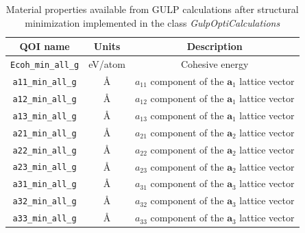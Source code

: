 \begin{table}[ht]
	\centering
	\caption{Material properties available from GULP calculations after structural minimization implemented in the class \emph{GulpOptiCalculations}}
	\label{tbl:pypospack_qoi_gulp_opti}
	\begin{tabular}{ccc}
		\hline
		QOI name & Units & Description \\
		\hline
		\verb|Ecoh_min_all_g|
		    & eV/atom
				& Cohesive energy\\
    \verb|a11_min_all_g|
		    & \AA
				& $a_{11}$ component of the $\bm{a}_1$ lattice vector \\
	  \verb|a12_min_all_g|
		    & \AA
				& $a_{12}$ component of the $\bm{a}_1$ lattice vector \\
	  \verb|a13_min_all_g|
		    & \AA
				& $a_{13}$ component of the $\bm{a}_1$ lattice vector \\
    \verb|a21_min_all_g|
		    & \AA
				& $a_{21}$ component of the $\bm{a}_2$ lattice vector\\
	  \verb|a22_min_all_g|
		    & \AA
				& $a_{22}$ component of the $\bm{a}_2$ lattice vector \\
	  \verb|a23_min_all_g|
		    & \AA
				& $a_{23}$ component of the $\bm{a}_2$ lattice vector \\
    \verb|a31_min_all_g|
		    & \AA
				& $a_{31}$ component of the $\bm{a}_3$ lattice vector \\
	  \verb|a32_min_all_g|
		    & \AA
				& $a_{32}$ component of the $\bm{a}_3$ lattice vector \\
	  \verb|a33_min_all_g|
		    & \AA
				& $a_{33}$ component of the $\bm{a}_3$ lattice vector \\
		\hline
	\end{tabular}
\end{table}

